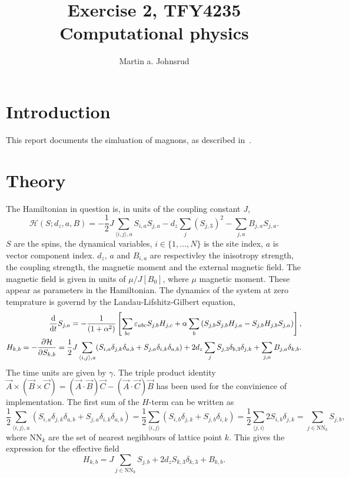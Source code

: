 \documentclass{article}
\title{Exercise 2, TFY4235 Computational physics}
\author{Martin a. Johnsrud}
\date{}
\begin{document}
    \maketitle
    \section*{Introduction}
    This report documents the simluation of magnons, as described in~\cite{exercise}.

    \section*{Theory}
    The Hamiltonian in question is, in units of the coupling constant $J$, 
    \begin{equation*}
        \mathcal{H}(S; d_z, a, B) = -\frac{1}{2} J \sum_{\langle i, j \rangle, a} S_{i, a} S_{j, a} - d_z \sum_{j} (S_{j,3})^2 -  \sum_{j, a} B_{j, a} S_{j,a}.
    \end{equation*}
    $S$ are the spins, the dynamical variables, $i\in\{1, ..., N\}$ is the site index, $a$ is vector component index. $d_z, \, a$ and $B_{i, a}$ are respectivley the inisotropy strength, the coupling strength, the magnetic moment and the external magnetic field. The magnetic field is given in units of $\mu/J[B_0]$, where $\mu$ magnetic moment. These appear as parameters in the Hamiltonian. The dynamics of the system at zero temprature is governd by the Landau-Lifshitz-Gilbert equation,
    \begin{align*}
        \dv{t} S_{j, a} = - \frac{1}{(1 + \alpha^2)}\left[\sum_{b c}\varepsilon_{abc}S_{j, b}H_{j,c} + \alpha \sum_{b}\left(S_{j, b}S_{j, b}H_{j, a} - S_{j, b}H_{j, b}S_{j, a}\right)\right], \\
        H_{k, b} = - \pdv{\mathcal{H}}{S_{k, b}} = \frac{1}{2} J \sum_{\langle i, j \rangle, a} (S_{i, a}\delta_{j,k}\delta_{a, b} + S_{j, a}\delta_{i,k}\delta_{a, b}) + 2 d_z \sum_{j} S_{j,3} \delta_{b, 3}\delta_{j, k} +  \sum_{j, a} B_{j, a} \delta_{k,b}.
    \end{align*}
    The time units are given by $\gamma$. The triple product identity $\vec A \times (\vec B \times \vec C) = (\vec A \cdot \vec B) \vec C - (\vec A \cdot \vec C) \vec B$ has been used for the convinience of implementation. The first sum of the $H$-term can be written as
    \begin{equation*}
        \frac{1}{2}\sum_{\langle i, j \rangle, a} (S_{i, a}\delta_{j,k}\delta_{a, b} + S_{j, a}\delta_{i,k}\delta_{a, b}) = \frac{1}{2}\sum_{\langle i, j \rangle} (S_{i, b}\delta_{j,k} + S_{j, b}\delta_{i,k}) = \frac{1}{2}\sum_{\langle j, i \rangle} 2S_{i, b} \delta_{j, k} = \sum_{j \in \mathrm{NN}_k} S_{j, b},
    \end{equation*}
    where $\mathrm{NN}_k$ are the set of nearest negihbours of lattice point $k$. This gives the expression for the effective field
    \begin{equation*}
        H_{k, b} = J\sum_{j \in \mathrm{NN}_k} S_{j, b} + 2d_z S_{k, 3} \delta_{k, 3} +  B_{k, b}.
    \end{equation*}
    
    
\end{document}
